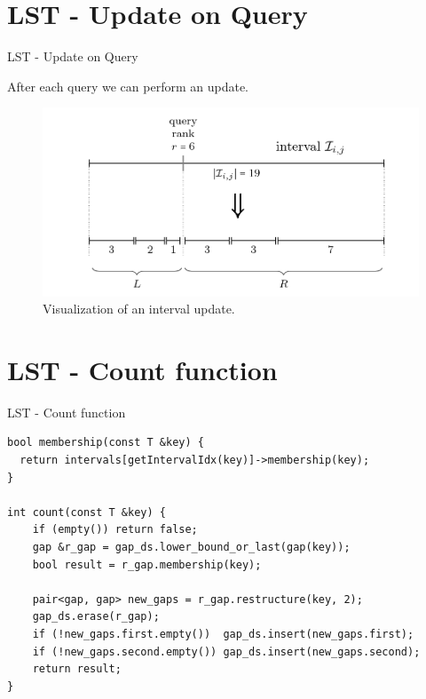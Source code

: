 \documentclass[aspectratio=169,xcolor=dvipsnames]{beamer}
\begin{document}
\section{LST - Update on Query}
\begin{frame}{LST - Update on Query}

After each query we can perform an update.

\begin{figure}[h]
    \centering
    \includegraphics[width=0.8\linewidth]{lst2.png}
    \caption{Visualization of an interval update.}
\end{figure}

\end{frame}

\section{LST - Count function}
\begin{frame}[fragile]{LST - Count function}

\begin{verbatim}
bool membership(const T &key) {
  return intervals[getIntervalIdx(key)]->membership(key);
}

int count(const T &key) {
    if (empty()) return false;
    gap &r_gap = gap_ds.lower_bound_or_last(gap(key));
    bool result = r_gap.membership(key);
    
    pair<gap, gap> new_gaps = r_gap.restructure(key, 2);
    gap_ds.erase(r_gap); 
    if (!new_gaps.first.empty())  gap_ds.insert(new_gaps.first);
    if (!new_gaps.second.empty()) gap_ds.insert(new_gaps.second);
    return result;
}
\end{verbatim}

\end{frame}


\end{document}
